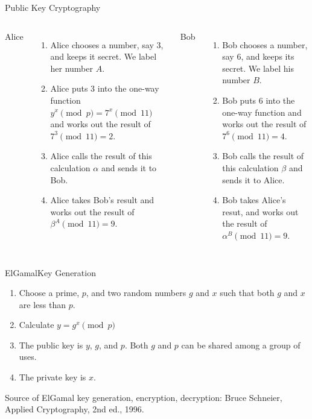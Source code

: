 \documentclass[utf8]{beamer}
\begin{document}
\begin{frame}{Public Key Cryptography}

 \begin{columns}[t]
   Alice
   \begin{enumerate}
   \item<1-> Alice chooses a number, say 3, and keeps it secret. We
     label her number $A$.
   \item<2-> Alice puts 3 into the one-way function $y^x\pmod p =
     7^x\pmod 11$ and works out the result of $7^3\pmod{11} = 2$.
   \item<3-> Alice calls the result of this calculation $\alpha$ and
     sends it to Bob.
   \item<4-> Alice takes Bob's result and works out the result of
     $\beta^A\pmod{11} = 9$.
   \end{enumerate}

  Bob
  \begin{enumerate}
  \item<1-> Bob chooses a number, say 6, and keeps its secret. We
    label his number $B$.
  \item<2-> Bob puts 6 into the one-way function and works out the
    result of $7^6\pmod{11} = 4$.
  \item<3-> Bob calls the result of this calculation $\beta$ and
    sends it to Alice.
  \item<4-> Bob takes Alice's resut, and works out the result of
    $\alpha^B\pmod{11} = 9$.
  \end{enumerate}  
\end{columns}

\end{frame}

\begin{frame}{ElGamal}{Key Generation}

  \begin{enumerate}
    \item Choose a prime, $p$, and two random numbers $g$ and $x$ such
      that both $g$ and $x$ are less than $p$.
    \item Calculate $y = g^x\pmod{p}$
    \item The public key is $y$, $g$, and $p$. Both $g$ and $p$ can be
      shared among a group of uses. 
    \item The private key is $x$.

  \end{enumerate}

Source of ElGamal key generation, encryption, decryption: Bruce
Schneier, Applied Cryptography, 2nd ed., 1996.

\end{frame}
\end{document}
